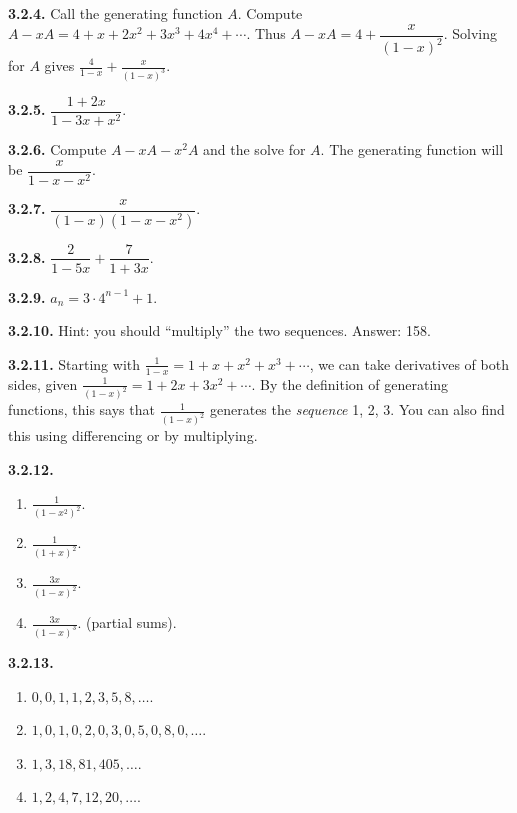 \documentclass[10pt,]{book}
\theoremstyle{plain}
\theoremstyle{definition}
\theoremstyle{definition}
\theoremstyle{definition}
\theoremstyle{definition}
\numberwithin{equation}{chapter}
\def\d{\displaystyle}
\begin{document}
%
\par\smallskip
\noindent\textbf{3.2.4.} \hypertarget{p-1025}{}%
Call the generating function \(A\). Compute \(A - xA = 4 + x + 2x^2 + 3x^3 + 4x^4 + \cdots\). Thus \(A - xA = 4 + \dfrac{x}{(1-x)^2}\). Solving for \(A\) gives \(\d\frac{4}{1-x} + \frac{x}{(1-x)^3}\).%
\par\smallskip
\noindent\textbf{3.2.5.} \hypertarget{p-1027}{}%
\(\dfrac{1+2x}{1-3x + x^2}\).%
\par\smallskip
\noindent\textbf{3.2.6.} \hypertarget{p-1029}{}%
Compute \(A - xA - x^2A\) and the solve for \(A\). The generating function will be \(\dfrac{x}{1-x-x^2}\).%
\par\smallskip
\noindent\textbf{3.2.7.} \hypertarget{p-1031}{}%
\(\dfrac{x}{(1-x)(1-x-x^2)}\).%
\par\smallskip
\noindent\textbf{3.2.8.} \hypertarget{p-1033}{}%
\(\dfrac{2}{1-5x} + \dfrac{7}{1+3x}\).%
\par\smallskip
\noindent\textbf{3.2.9.} \hypertarget{p-1035}{}%
\(a_n = 3\cdot 4^{n-1} + 1\).%
\par\smallskip
\noindent\textbf{3.2.10.} \hypertarget{p-1037}{}%
Hint: you should ``multiply'' the two sequences. Answer: 158.%
\par\smallskip
\noindent\textbf{3.2.11.} \hypertarget{p-1039}{}%
Starting with \(\frac{1}{1-x} = 1 + x + x^2 + x^3 +\cdots\), we can take derivatives of both sides, given \(\frac{1}{(1-x)^2} = 1 + 2x + 3x^2 + \cdots\). By the definition of generating functions, this says that \(\frac{1}{(1-x)^2}\) generates the \emph{sequence} 1, 2, 3\textellipsis{}. You can also find this using differencing or by multiplying.%
\par\smallskip
\noindent\textbf{3.2.12.} \hypertarget{p-1042}{}%
\leavevmode%
\begin{enumerate}[label=(\alph*)]
\item\hypertarget{li-194}{}\(\frac{1}{(1-x^2)^2}\).%
\item\hypertarget{li-195}{}\(\frac{1}{(1+x)^2}\).%
\item\hypertarget{li-196}{}\(\frac{3x}{(1-x)^2}\).%
\item\hypertarget{li-197}{}\(\frac{3x}{(1-x)^3}\).  (partial sums).%
\end{enumerate}
%
\par\smallskip
\noindent\textbf{3.2.13.} \hypertarget{p-1045}{}%
\leavevmode%
\begin{enumerate}[label=(\alph*)]
\item\hypertarget{li-202}{}\(0,0,1,1,2,3,5,8, \ldots\).%
\item\hypertarget{li-203}{}\(1, 0, 1, 0, 2, 0, 3, 0, 5, 0, 8, 0, \ldots\).%
\item\hypertarget{li-204}{}\(1, 3, 18, 81, 405, \ldots\).%
\item\hypertarget{li-205}{}\(1, 2, 4, 7, 12, 20, \ldots\).%
\end{enumerate}
\end{document}
